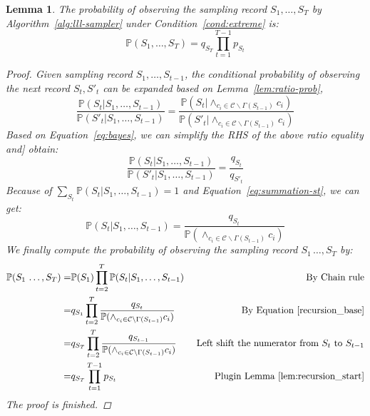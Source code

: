 \documentclass[letterpaper]{article} %
\newtheorem{lemma}{Lemma}
\newcommand{\p}{\mathbb{P}}
\begin{document}
\begin{lemma} \label{lem:sample-record}
The probability of observing the sampling record  $S_1,\ldots,S_T$ by Algorithm~\ref{alg:lll-sampler} under Condition~\ref{cond:extreme} is:
\begin{equation}\label{pS_final}
    \p(S_1,\ldots ,S_T)=q_{S_T} \prod_{t=1}^{T-1} p_{S_t} 
\end{equation}
\begin{proof}
Given sampling record  $S_1,\ldots,S_{t-1}$, the conditional probability of observing the next record {$S_t,S'_t$} can be expanded  based on Lemma~\ref{lem:ratio-prob},
\begin{equation*}
\frac{\p(S_t | S_1, \ldots, S_{t-1})}{\p(S'_t | S_1, \ldots, S_{t-1})}=\frac{\p(S_t |\wedge_{c_i \in \mathcal{C}\backslash \Gamma(S_{t-1})}c_i)}{\p(S'_t |\wedge_{c_i \in \mathcal{C}\backslash \Gamma(S_{t-1})}c_i)}
\end{equation*}
Based on Equation~\eqref{eq:bayes}, we {can simplify the RHS of the above ratio equality and}] obtain:
\begin{equation*}
\frac{\p(S_t | S_1, \ldots, S_{t-1})}{\p(S'_t | S_1, \ldots, S_{t-1})}=\frac{q_{S_t}}{q_{S'_t}}
\end{equation*}
Because of $\sum_{S_t}\p(S_t | S_1, \ldots, S_{t-1})=1$ and Equation~\eqref{eq:summation-st}, we can get:
\begin{equation}\label{recursion_base}
  \p(S_t | S_1, \ldots, S_{t-1})=  \frac{q_{S_t}}{\p(\wedge_{c_i \in \mathcal{C}\backslash \Gamma(S_{t-1})}c_i)}
\end{equation}
We finally compute the probability of observing the sampling record $S_1\,\ldots, S_T$ by:
\begin{equation*}
\begin{aligned} 
    \p(S_1\,\ldots ,S_T)=&   \p(S_1)\prod_{t=2}^T\p(S_t | S_1,\ldots,S_{t-1})  &\text{ By Chain rule}\\
    =&q_{S_1}\prod_{t=2}^T \frac{q_{S_t}}{\p(\wedge_{c_i \in \mathcal{C}\backslash \Gamma(S_{t-1})}c_i)}  &\text{ By Equation~\eqref{recursion_base}}\\
    =&q_{S_T} \prod_{t=2}^T \frac{q_{S_{t-1}}}{\p(\wedge_{c_i \in \mathcal{C}\backslash \Gamma(S_{t-1})}c_i)}  &\text{ Left shift the numerator from $S_t$ to $S_{t-1}$}\\
    =&q_{S_T} \prod_{t=1}^{T-1} p_{S_t} & \text{Plugin  Lemma~\ref{lem:recursion_start}}
\end{aligned}    
\end{equation*}
The proof is finished.
\end{proof}
\end{lemma}
\end{document}
